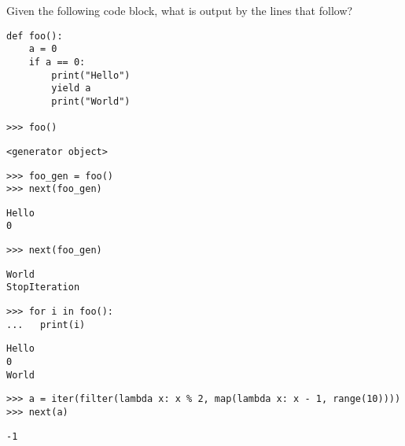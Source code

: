 \begin{blocksection}
\question Given the following code block, what is output by the lines that follow?

\begin{lstlisting}
def foo():
    a = 0
    if a == 0:
        print("Hello")
        yield a
        print("World")

>>> foo()
\end{lstlisting}
\begin{solution}[0.25in]
\begin{lstlisting}
<generator object>
\end{lstlisting}
\end{solution}
\end{blocksection}

\begin{blocksection}
\begin{lstlisting}
>>> foo_gen = foo()
>>> next(foo_gen)
\end{lstlisting}

\begin{solution}[0.5in]
\begin{lstlisting}
Hello
0
\end{lstlisting}
\end{solution}
\end{blocksection}

\begin{blocksection}
\begin{lstlisting}
>>> next(foo_gen)
\end{lstlisting}

\begin{solution}[0.5in]
\begin{lstlisting}
World
StopIteration
\end{lstlisting}
\end{solution}
\end{blocksection}

\begin{blocksection}
\begin{lstlisting}
>>> for i in foo():
...   print(i)
\end{lstlisting}

\begin{solution}[0.5in]
\begin{lstlisting}
Hello
0
World
\end{lstlisting}
\end{solution}
\end{blocksection}

\begin{blocksection}

\begin{lstlisting}
>>> a = iter(filter(lambda x: x % 2, map(lambda x: x - 1, range(10))))
>>> next(a)
\end{lstlisting}

\begin{solution}[0.25in]
    \begin{lstlisting}
-1
    \end{lstlisting}
    \end{solution}
\end{blocksection}

